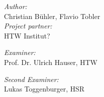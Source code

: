 \begin{titlepage}
\begin{center}
{\normalsize

\textit{Author:}\\
Christian Bühler, Flavio Tobler\\[35mm]



\textit{Project partner:}\\
HTW Institut?

\textit{Examiner:}\\
Prof. Dr. Ulrich Hauser, HTW

\textit{Second Examiner:}\\
Lukas Toggenburger, HSR

}
\end{center}
\end{titlepage}

\restoregeometry %

